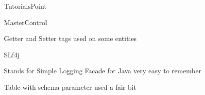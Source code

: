 \documentclass[presentation]{beamer}
\begin{document}
\begin{frame}[label={sec:orgbb65cb0}]{TutorialsPoint}
\end{frame}
\begin{frame}[label={sec:org0fcfc3b}]{MasterControl}
\begin{block}{Getter and Setter tags used on some entities}
\end{block}
\begin{block}{SLf4j}
\begin{block}{Stands for Simple Logging Facade for Java}
very easy to remember
\end{block}
\end{block}
\begin{block}{Table with schema parameter used a fair bit}
\end{block}
\end{frame}
\end{document}
